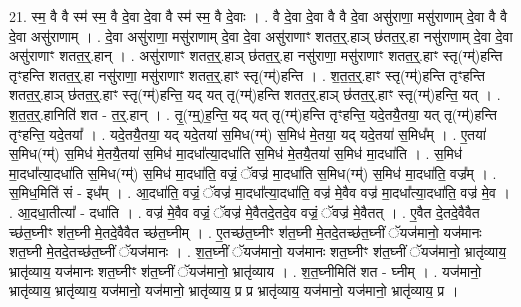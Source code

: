 \documentclass[17pt]{extarticle}
\begin{document}
21. स्म॒ वै वै स्म॑ स्म॒ वै दे॒वा दे॒वा वै स्म॑ स्म॒ वै दे॒वाः । . वै दे॒वा दे॒वा वै वै दे॒वा असु॑राणा॒ मसु॑राणाम् दे॒वा वै वै दे॒वा असु॑राणाम् । . दे॒वा असु॑राणा॒ मसु॑राणाम् दे॒वा दे॒वा असु॑राणाꣳ शतत॒र्॒.हाञ् छ॑तत॒र्॒.हा नसु॑राणाम् दे॒वा दे॒वा असु॑राणाꣳ शतत॒र्॒.हान् । . असु॑राणाꣳ शतत॒र्॒.हाञ् छ॑तत॒र्॒.हा नसु॑राणा॒ मसु॑राणाꣳ शतत॒र्॒.हाꣳ स्तृ(ग्म्॑)हन्ति तृꣳहन्ति शतत॒र्॒.हा नसु॑राणा॒ मसु॑राणाꣳ शतत॒र्॒.हाꣳ स्तृ(ग्म्॑)हन्ति । . श॒त॒त॒र्॒.हाꣳ स्तृ(ग्म्॑)हन्ति तृꣳहन्ति शतत॒र्॒.हाञ् छ॑तत॒र्॒.हाꣳ स्तृ(ग्म्॑)हन्ति॒ यद् यत् तृ(ग्म्॑)हन्ति शतत॒र्॒.हाञ् छ॑तत॒र्॒.हाꣳ स्तृ(ग्म्॑)हन्ति॒ यत् । . श॒त॒त॒र्॒.हानिति॑ शत - त॒र्॒.हान् । . तृ॒(ग्म्॒)ह॒न्ति॒ यद् यत् तृ(ग्म्॑)हन्ति तृꣳहन्ति॒ यदे॒तयै॒तया॒ यत् तृ(ग्म्॑)हन्ति तृꣳहन्ति॒ यदे॒तया᳚ । . यदे॒तयै॒तया॒ यद् यदे॒तया॑ स॒मिध(ग्म्॑) स॒मिध॑ मे॒तया॒ यद् यदे॒तया॑ स॒मिध᳚म् । . ए॒तया॑ स॒मिध(ग्म्॑) स॒मिध॑ मे॒तयै॒तया॑ स॒मिध॑ मा॒दधा᳚त्या॒दधा॑ति स॒मिध॑ मे॒तयै॒तया॑ स॒मिध॑ मा॒दधा॑ति । . स॒मिध॑ मा॒दधा᳚त्या॒दधा॑ति स॒मिध(ग्म्॑) स॒मिध॑ मा॒दधा॑ति॒ वज्रं॒ ॅवज्र॑ मा॒दधा॑ति स॒मिध(ग्म्॑) स॒मिध॑ मा॒दधा॑ति॒ वज्र᳚म् । . स॒मिध॒मिति॑ सं - इध᳚म् । . आ॒दधा॑ति॒ वज्रं॒ ॅवज्र॑ मा॒दधा᳚त्या॒दधा॑ति॒ वज्र॑ मे॒वैव वज्र॑ मा॒दधा᳚त्या॒दधा॑ति॒ वज्र॑ मे॒व । . आ॒दधा॒तीत्या᳚ - दधा॑ति । . वज्र॑ मे॒वैव वज्रं॒ ॅवज्र॑ मे॒वैतदे॒तदे॒व वज्रं॒ ॅवज्र॑ मे॒वैतत् । . ए॒वैत दे॒तदे॒वैवैत च्छ॑त॒घ्नीꣳ श॑त॒घ्नी मे॒तदे॒वैवैत च्छ॑त॒घ्नीम् । . ए॒तच्छ॑त॒घ्नीꣳ श॑त॒घ्नी मे॒तदे॒तच्छ॑त॒घ्नीं ॅयज॑मानो॒ यज॑मानः शत॒घ्नी मे॒तदे॒तच्छ॑त॒घ्नीं ॅयज॑मानः । . श॒त॒घ्नीं ॅयज॑मानो॒ यज॑मानः शत॒घ्नीꣳ श॑त॒घ्नीं ॅयज॑मानो॒ भ्रातृ॑व्याय॒ भ्रातृ॑व्याय॒ यज॑मानः शत॒घ्नीꣳ श॑त॒घ्नीं ॅयज॑मानो॒ भ्रातृ॑व्याय । . श॒त॒घ्नीमिति॑ शत - घ्नीम् । . यज॑मानो॒ भ्रातृ॑व्याय॒ भ्रातृ॑व्याय॒ यज॑मानो॒ यज॑मानो॒ भ्रातृ॑व्याय॒ प्र प्र भ्रातृ॑व्याय॒ यज॑मानो॒ यज॑मानो॒ भ्रातृ॑व्याय॒ प्र । \newline
\end{document}
